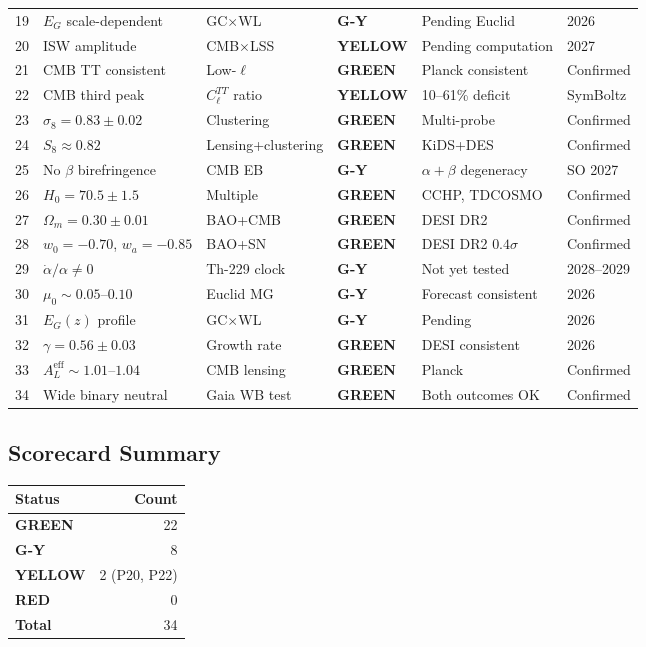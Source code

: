 \documentclass[11pt,a4paper]{article}
\newcommand{\GREEN}{\textcolor{dfdgreen}{\textbf{GREEN}}}
\newcommand{\YELLOW}{\textcolor{dfdyellow}{\textbf{YELLOW}}}
\newcommand{\RED}{\textcolor{dfdred}{\textbf{RED}}}
\newcommand{\GY}{\textcolor{dfdgy}{\textbf{G-Y}}}
\begin{document}
\begin{center}
\begin{longtable}{clp{4.5cm}lll}
19 & $E_G$ scale-dependent & GC$\times$WL & \GY & Pending Euclid & 2026 \\
20 & ISW amplitude & CMB$\times$LSS & \YELLOW & Pending computation & 2027 \\
21 & CMB TT consistent & Low-$\ell$ & \GREEN & Planck consistent & Confirmed \\
22 & CMB third peak & $C_\ell^{TT}$ ratio & \YELLOW & 10--61\% deficit & SymBoltz \\
23 & $\sigma_8 = 0.83 \pm 0.02$ & Clustering & \GREEN & Multi-probe & Confirmed \\
24 & $S_8 \approx 0.82$ & Lensing+clustering & \GREEN & KiDS+DES & Confirmed \\
25 & No $\beta$ birefringence & CMB EB & \GY & $\alpha+\beta$ degeneracy & SO 2027 \\
26 & $H_0 = 70.5 \pm 1.5$ & Multiple & \GREEN & CCHP, TDCOSMO & Confirmed \\
27 & $\Omega_m = 0.30 \pm 0.01$ & BAO+CMB & \GREEN & DESI DR2 & Confirmed \\
28 & $w_0 = -0.70$, $w_a = -0.85$ & BAO+SN & \GREEN & DESI DR2 $0.4\sigma$ & Confirmed \\
29 & $\dot{\alpha}/\alpha \neq 0$ & Th-229 clock & \GY & Not yet tested & 2028--2029 \\
30 & $\mu_0 \sim 0.05$--$0.10$ & Euclid MG & \GY & Forecast consistent & 2026 \\
31 & $E_G(z)$ profile & GC$\times$WL & \GY & Pending & 2026 \\
32 & $\gamma = 0.56 \pm 0.03$ & Growth rate & \GREEN & DESI consistent & 2026 \\
33 & $A_L^\mathrm{eff} \sim 1.01$--$1.04$ & CMB lensing & \GREEN & Planck & Confirmed \\
34 & Wide binary neutral & Gaia WB test & \GREEN & Both outcomes OK & Confirmed \\
\bottomrule
\end{longtable}
\end{center}

\subsection{Scorecard Summary}

\begin{center}
\begin{tabular}{lr}
\toprule
\textbf{Status} & \textbf{Count} \\
\midrule
\GREEN & 22 \\
\GY & 8 \\
\YELLOW & 2 (P20, P22) \\
\RED & 0 \\
\midrule
\textbf{Total} & 34 \\
\bottomrule
\end{tabular}
\end{center}
\end{document}
